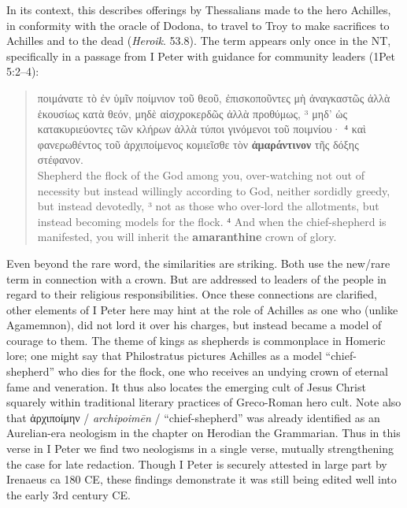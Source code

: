 In its context, this describes offerings by Thessalians made to the hero Achilles, %
in conformity with the oracle of Dodona, %
to travel to Troy to make sacrifices to Achilles and to the dead (\textit{Heroik}. 53.8).
The term appears only once in the NT, specifically in %
a passage from I Peter with guidance for community leaders (1Pet 5:2--4): %

\vspace*{3mm} 
 \begin{quote}ποιμάνατε τὸ ἐν ὑμῖν ποίμνιον τοῦ θεοῦ, %
 ἐπισκοποῦντες μὴ ἀναγκαστῶς ἀλλὰ ἑκουσίως κατὰ θεόν, %
 μηδὲ αἰσχροκερδῶς ἀλλὰ προθύμως, 
 ³ μηδ’ ὡς κατακυριεύοντες τῶν κλήρων ἀλλὰ τύποι γινόμενοι τοῦ ποιμνίου· %
 ⁴ καὶ φανερωθέντος τοῦ ἀρχιποίμενος κομιεῖσθε τὸν \textbf{ἀμαράντινον} τῆς δόξης στέφανον. \\[1mm] %
 Shepherd the flock of the God among you, %
 over-watching not out of necessity but instead willingly according to God, %
 neither sordidly greedy, but instead devotedly, %
 ³ not as those who over-lord the allotments, but instead becoming models for the flock. %
 ⁴ And when the chief-shepherd is manifested, you will inherit the \textbf{amaranthine} crown of glory. \end{quote} %
 \vspace*{3mm}

Even beyond the rare word, the similarities are striking. %
Both use the new/rare term in connection with a crown. %
But are addressed to leaders of the people in regard to their religious responsibilities. %
Once these connections are clarified, %
other elements of I Peter here may hint at the role of Achilles as %
one who (unlike Agamemnon), did not lord it over his charges, %
but instead became a model of courage to them. %
The theme of kings as shepherds is commonplace in Homeric lore; %
one might say that Philostratus pictures Achilles as a model “chief-shepherd” who dies for the flock, %
one who receives an undying crown of eternal fame and veneration. %
It thus also locates the emerging cult of Jesus Christ squarely within %
traditional literary practices of Greco-Roman hero cult. %
Note also that ἀρχιποίμην / \textit{archipoimēn} / “chief-shepherd” was already identified as an Aurelian-era neologism %
in the chapter on Herodian the Grammarian. %
Thus in this verse in I Peter we find two neologisms in a single verse, %
mutually strengthening the case for late redaction. %
Though I Peter is securely attested in large part by Irenaeus ca 180 CE, %
these findings demonstrate it was still being edited well into the early 3rd century CE. %

